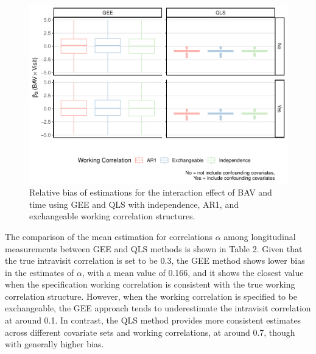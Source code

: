 \documentclass[
]{aft}
\begin{document}
\begin{figure}[H]

{\centering \includegraphics{FinalReport_files/figure-pdf/unnamed-chunk-5-1.pdf}

}

\caption{Relative bias of estimations for the interaction effect of BAV
and time using GEE and QLS with independence, AR1, and exchangeable
working correlation structures.}

\end{figure}%

The comparison of the mean estimation for correlations \(\alpha\) among
longitudinal measurements between GEE and QLS methods is shown in Table
2. Given that the true intravisit correlation is set to be 0.3, the GEE
method shows lower bias in the estimates of \(\alpha\), with a mean
value of 0.166, and it shows the closest value when the specification
working correlation is consistent with the true working correlation
structure. However, when the working correlation is specified to be
exchangeable, the GEE approach tends to underestimate the intravisit
correlation at around 0.1. In contrast, the QLS method provides more
consistent estimates across different covariate sets and working
correlations, at around 0.7, though with generally higher bias.
\end{document}
